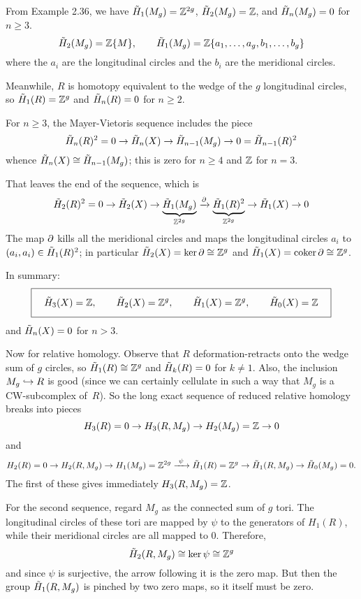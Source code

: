 \soln From Example 2.36, we have $\tilde H_1(M_g)=\mathbb{Z}^{2g}$,
$\tilde H_2(M_g)=\mathbb{Z}$, and $\tilde H_n(M_g)=0$ for $n\geq 3$.
$$
\tilde H_2(M_g)=\mathbb{Z}\{M\},\qquad
\tilde H_1(M_g)=\mathbb{Z}\{a_1,\dots,a_g,b_1,\dots,b_g\}
$$
where the $a_i$ are the longitudinal circles and the $b_i$ are the
meridional circles.

Meanwhile, $R$ is homotopy equivalent to the wedge of the $g$
longitudinal circles, so $\tilde H_1(R)=\mathbb{Z}^g$
and $\tilde H_n(R)=0$ for $n\geq 2$.

For $n\geq 3$, the Mayer-Vietoris sequence includes the piece
$$\tilde H_n(R)^2 = 0 \to \tilde H_n(X) \to \tilde H_{n-1}(M_g) \to 0 = \tilde H_{n-1}(R)^2$$
whence $\tilde H_n(X)\cong \tilde H_{n-1}(M_g)$; this is zero for $n\geq 4$ and $\mathbb{Z}$ for $n=3$.

That leaves the end of the sequence, which is
$$\tilde H_2(R)^2 = 0 \to \tilde H_2(X) \to \underbrace{\tilde H_1(M_g)}_{\mathbb{Z}^{2g}}
\xrightarrow{\partial} \underbrace{\tilde H_1(R)^2}_{\mathbb{Z}^{2g}} \to\tilde H_1(X)\to 0$$
The map $\partial$ kills all the meridional circles and maps
the longitudinal circles $a_i$ to $(a_i,a_i)\in\tilde H_1(R)^2$;
in particular $\tilde H_2(X)=\ker\partial\cong\mathbb{Z}^g$ and $\tilde H_1(X)=\operatorname{coker}\partial\cong\mathbb{Z}^g$.

In summary:
\[\boxed{\quad\pad\HH_3(X)=\Zz,\qquad
\HH_2(X)=\Zz^g,\qquad
\HH_1(X)=\Zz^g,\qquad
\HH_0(X)=\Zz\quad}\]
and $\tilde H_n(X)=0$ for $n>3$.

\littleline

Now for relative homology.  Observe that $R$ deformation-retracts onto the wedge sum of $g$ circles, so $\tilde H_1(R)\cong\mathbb{Z}^g$ and $\tilde H_k(R)=0$ for $k\neq1$.  Also, the inclusion $M_g\hookrightarrow R$ is good (since we can certainly cellulate in such a way that $M_g$ is a CW-subcomplex of~$R$).  So the long exact sequence of reduced relative homology breaks into pieces
\[H_3(R)=0 \to H_3(R,M_g) \to H_2(M_g)=\mathbb{Z} \to 0\]
and
\[H_2(R)=0 \to H_2(R,M_g) \to H_1(M_g)=\mathbb{Z}^{2g} \xrightarrow{~\psi~} \tilde H_1(R)=\mathbb{Z}^g \to \tilde H_1(R,M_g)\to \tilde H_0(M_g)=0.\]
The first of these gives immediately $H_3(R,M_g)=\mathbb{Z}$.

For the second sequence, regard $M_g$ as the connected sum of $g$ tori.  The longitudinal circles of these tori are mapped by $\psi$ to the generators of $H_1(R)$, while their meridional circles are all mapped to 0.  Therefore,
\[\tilde H_2(R,M_g) \cong \ker\psi \cong \mathbb{Z}^g\]
and since $\psi$ is surjective, the arrow following it is the zero map.  But then the group $\tilde H_1(R,M_g)$ is pinched by two zero maps, so it itself must be zero.

